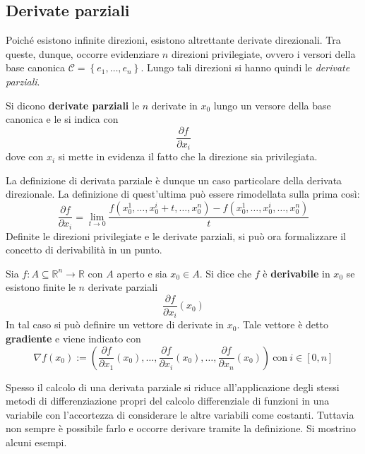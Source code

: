 \subsection{Derivate parziali}
Poiché esistono infinite direzioni, esistono altrettante derivate direzionali. Tra queste, dunque, occorre evidenziare $n$ direzioni privilegiate, ovvero i versori della base canonica $\mathcal{C}=\left\{e_1,\dots, e_n\right\}$. Lungo tali direzioni si hanno quindi le \textit{derivate parziali}.
\begin{definition} \label{Def: Derivate parziali}
    Si dicono \textbf{derivate parziali} le $n$ derivate in $x_0$ lungo un versore della base canonica e le si indica con
    \begin{equation}
        \frac{\partial{f}}{\partial{x_i}}
    \end{equation}
    dove con $x_i$ si mette in evidenza il fatto che la direzione sia privilegiata.
\end{definition}
La definizione di derivata parziale è dunque un caso particolare della derivata direzionale. La definizione di quest'ultima può essere rimodellata sulla prima così:
\begin{equation}
    \frac{\partial{f}}{\partial{x_i}}=\lim_{t \to 0}{\frac{f(x_0^1, \dots, x_0^i+t, \dots, x_0^n)-f(x_0^1, \dots, x_0^i, \dots, x_0^n)}{t}}
\end{equation}
Definite le direzioni privilegiate e le derivate parziali, si può ora formalizzare il concetto di derivabilità in un punto.
\begin{definition} \label{Def: Derivabilità}
    Sia $f:A \subseteq \mathbb{R}^n \to \mathbb{R}$ con $A$ aperto e sia $x_0 \in A$. Si dice che $f$ è \textbf{derivabile} in $x_0$ se esistono finite le $n$ derivate parziali
    \begin{equation}
        \frac{\partial{f}}{\partial{x_i}}(x_0)
    \end{equation}
In tal caso si può definire un vettore di derivate in $x_0$. Tale vettore è detto \textbf{gradiente} e viene indicato con
\begin{equation}
    \nabla f(x_0) := \left(\frac{\partial{f}}{\partial{x_1}}(x_0), \dots, \frac{\partial{f}}{\partial{x_i}}(x_0), \dots, \frac{\partial{f}}{\partial{x_n}}(x_0)\right)\ \text{con}\ i \in [0,n]
\end{equation}
\end{definition}
Spesso il calcolo di una derivata parziale si riduce all'applicazione degli stessi metodi di differenziazione propri del calcolo differenziale di funzioni in una variabile con l'accortezza di considerare le altre variabili come costanti. Tuttavia non sempre è possibile farlo e occorre derivare tramite la definizione. Si mostrino alcuni esempi.
